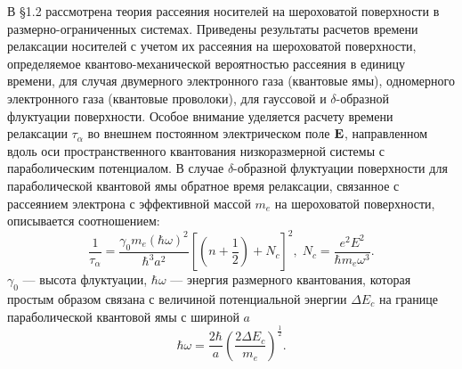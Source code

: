 В §1.2 рассмотрена теория рассеяния носителей на шероховатой поверхности в размерно-ограниченных системах. Приведены результаты расчетов времени релаксации носителей с учетом их рассеяния на шероховатой поверхности, определяемое квантово-механической вероятностью рассеяния в единицу времени, для случая двумерного электронного газа (квантовые ямы), одномерного электронного газа (квантовые проволоки), для гауссовой и $\delta$-образной флуктуации поверхности. Особое внимание уделяется расчету времени релаксации $\tau_\alpha$ во внешнем постоянном электрическом поле $\boldsymbol{\mathbf{E}}$, направленном вдоль оси пространственного квантования низкоразмерной системы с параболическим потенциалом.
В случае $\delta$-образной флуктуации поверхности для параболической квантовой ямы обратное время релаксации, связанное с рассеянием электрона с эффективной массой $m_e$ на шероховатой поверхности, описывается соотношением: 
\begin{equation} \label{eq:syn_01}
\frac{1}{\tau _{\alpha } } =\frac{\gamma_0 m_e (\hbar\omega)^2 }{\hbar^3 a^2 } \left[\left(n+\frac{1}{2} \right)+N_c \right]^2, \;
N_c =\frac{e^2 E^2 }{\hbar m_e \omega^3 } .
\end{equation}  
$\gamma_0 $ --- высота флуктуации, $\hbar\omega$ --- энергия размерного квантования, которая простым образом связана с величиной потенциальной энергии $\Delta E_c$ на границе параболической квантовой ямы с шириной $a$
\[
\hbar\omega = \frac{2\hbar}{a}\left(  \frac{2\Delta E_c}{m_e} \right)^{\frac{1}{2}}.
\]

